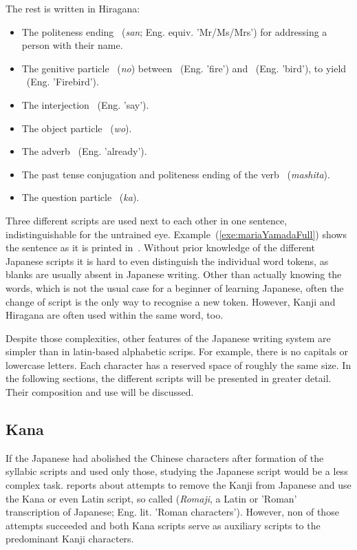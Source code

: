 The rest is written in Hiragana:
\begin{itemize}
  \item The politeness ending ~(\emph{san}; 
        Eng. equiv. 'Mr/Ms/Mrs') for addressing a person with their name.
  \item The genitive particle ~(\emph{no}) between 
        ~(Eng. 'fire') and ~(Eng. 'bird'), to yield 
        ~(Eng. 'Firebird').
  \item The interjection ~(Eng. 'say').
  \item The object particle ~(\emph{wo}).
  \item The adverb ~(Eng. 'already').
  \item The past tense conjugation and politeness ending of the 
        verb ~(\emph{mashita}).
  \item The question particle ~(\emph{ka}).
\end{itemize}

Three different scripts are used next to each other in one sentence,
indistinguishable for the untrained eye. Example~(\ref{exe:mariaYamadaFull}) 
shows the sentence as it is printed in~. Without prior
knowledge of the different Japanese scripts it is hard to even distinguish
the individual word tokens, as blanks are usually absent in Japanese writing.
Other than actually knowing the words, which is not the usual case for a 
beginner of learning Japanese, often the change of script is the only way to 
recognise a new token. However, Kanji and Hiragana are often used within the same
word, too.

Despite those complexities, other features of the Japanese writing system are 
simpler than in latin-based alphabetic scrips. 
For example, there is no capitals or lowercase letters.
Each character has a reserved space of roughly the same size.
In the following sections, the different scripts will be presented in greater 
detail. Their composition and use will be discussed.

\subsection{Kana }
\label{sec:kana}

If the Japanese had abolished the Chinese characters after formation of the
syllabic scripts and used only those, studying the Japanese script would be
a less complex task.  reports about attempts to remove
the Kanji from Japanese and use the Kana or even Latin script, so called
 (\emph{Romaji}, a Latin or 'Roman' transcription of Japanese; 
Eng. lit. 'Roman characters'). 
However, non of those attempts succeeded and both Kana scripts serve as 
auxiliary scripts to the predominant Kanji characters. 


